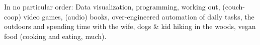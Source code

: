 
\inlineheadsection %
{In no particular order:}
{
    Data visualization,
    programming,
    working out,
    (couch-coop) video games,
    (audio) books,
    over-engineered automation of daily tasks,
    the outdoors and spending time with the wife, dogs \& kid hiking in the woods,
    vegan food (cooking and eating, much).
}

